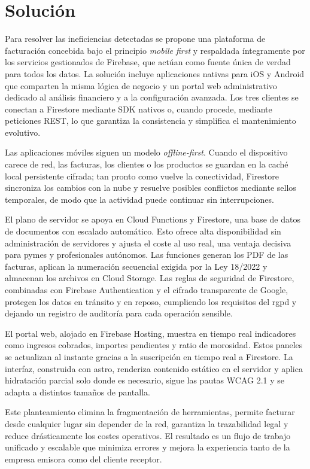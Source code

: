 \section{Solución}
\begin{large}
Para resolver las ineficiencias detectadas se propone una plataforma de facturación concebida bajo el principio \textit{mobile first} y respaldada íntegramente por los servicios gestionados de Firebase, que actúan como fuente única de verdad para todos los datos. La solución incluye aplicaciones nativas para iOS y Android que comparten la misma lógica de negocio y un portal web administrativo dedicado al análisis financiero y a la configuración avanzada. Los tres clientes se conectan a Firestore mediante SDK nativos o, cuando procede, mediante peticiones REST, lo que garantiza la consistencia y simplifica el mantenimiento evolutivo.

Las aplicaciones móviles siguen un modelo \textit{offline-first}. Cuando el dispositivo carece de red, las facturas, los clientes o los productos se guardan en la caché local persistente cifrada; tan pronto como vuelve la conectividad, Firestore sincroniza los cambios con la nube y resuelve posibles conflictos mediante sellos temporales, de modo que la actividad puede continuar sin interrupciones.

El plano de servidor se apoya en Cloud Functions y Firestore, una base de datos de documentos con escalado automático. Esto ofrece alta disponibilidad sin administración de servidores y ajusta el coste al uso real, una ventaja decisiva para pymes y profesionales autónomos. Las funciones generan los PDF de las facturas, aplican la numeración secuencial exigida por la Ley 18/2022 y almacenan los archivos en Cloud Storage. Las reglas de seguridad de Firestore, combinadas con Firebase Authentication y el cifrado transparente de Google, protegen los datos en tránsito y en reposo, cumpliendo los requisitos del \gls{rgpd} y dejando un registro de auditoría para cada operación sensible.

El portal web, alojado en Firebase Hosting, muestra en tiempo real indicadores como ingresos cobrados, importes pendientes y ratio de morosidad. Estos paneles se actualizan al instante gracias a la suscripción en tiempo real a Firestore. La interfaz, construida con \gls{astro}, renderiza contenido estático en el servidor y aplica hidratación parcial solo donde es necesario, sigue las pautas WCAG 2.1 y se adapta a distintos tamaños de pantalla.

Este planteamiento elimina la fragmentación de herramientas, permite facturar desde cualquier lugar sin depender de la red, garantiza la trazabilidad legal y reduce drásticamente los costes operativos. El resultado es un flujo de trabajo unificado y escalable que minimiza errores y mejora la experiencia tanto de la empresa emisora como del cliente receptor.
\end{large}

